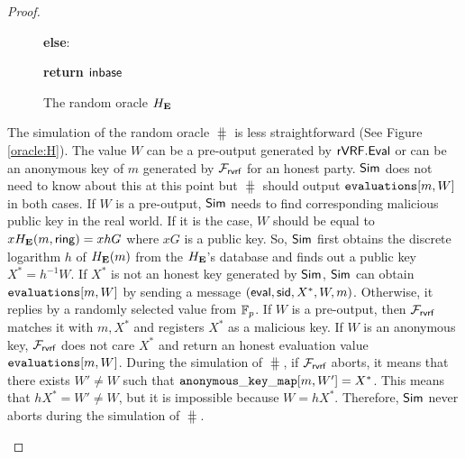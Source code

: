 \begin{proof}
\begin{itemize}
\begin{figure}
{{					
					
					
					
					
					\textbf{else}:
					
					
					
					\textbf{return $ {\mathsf{inbase}}$}
					
			}}	
			\caption{The random oracle $ H_{\mathbf{E}} $}
			\label{oracle:HgnoPK}
		\end{figure}
		The simulation of the random oracle $ \hash $ is less straightforward (See Figure \ref{oracle:H}).
		The value $ W $ can be a pre-output generated by $ {\mathsf{rVRF}}.{\mathsf{Eval}} $ or can be an anonymous key of  $ m $ generated by $ \mathcal{F}_{\textsf{rvrf}} $ for an honest party. $ \mathsf{Sim} $ does not need to know about this at this point but $ \hash $ should output $ \texttt{evaluations}[m,W] $ in both cases.	 
		If $ W $ is a pre-output, $ \mathsf{Sim} $ needs to find corresponding malicious public key in the real world. If it is the case, $ W $ should be equal to $ xH_{\mathbf{E}}(m, \mathsf{ring})= xhG $  where $ xG $ is a public key. 
		So, $ \mathsf{Sim} $ first obtains the discrete logarithm $ h $ of $ H_{\mathbf{E}}(m) $ from the $ H_{\mathbf{E}} $'s database and finds out a public key $ X^* = h^{-1}W $.    
		If $ X^*$ is not an honest key generated by $ \mathsf{Sim} $, $ \mathsf{Sim} $ can obtain $ \texttt{evaluations}[m,W] $ by sending a message $ (\mathsf{eval}, \textsf{sid},X^*,W,m) $.
		Otherwise, it replies by a randomly selected value from $ \mathbb{F}_p $.
		If $ W $ is a pre-output, then $ \mathcal{F}_{\textsf{rvrf}} $ matches it with $ m, X^* $ and registers $ X^* $ as a malicious key. If $ W $ is an anonymous key, $ \mathcal{F}_{\textsf{rvrf}} $ does not care $ X^* $ and return an honest evaluation value $ \texttt{evaluations}[m,W] $.
		During the simulation of $ \hash $, if $ \mathcal{F}_{\textsf{rvrf}} $ aborts, it means that there exists $ W' \neq W $ such that $ \mathtt{anonymous\_key\_map}[m,W'] = X^* $. This means that $ hX^* = W' \neq W  $, but it is impossible because $ W = hX^* $. Therefore, $ \mathsf{Sim} $ never aborts during the simulation of $ \hash $.
		

\end{itemize}
\end{proof}
